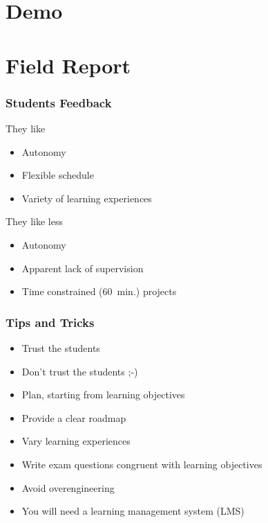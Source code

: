 \section{Demo}

\section{Field Report}

\begin{frame}
  \frametitle{Students Feedback}

  \begin{minipage}{0.48\textwidth}
    They like
    \begin{itemize}
    \item Autonomy
    \item Flexible schedule
    \item Variety of learning experiences
    \end{itemize}
  \end{minipage}
  \hfill
  \begin{minipage}{0.48\textwidth}
    They like less
    \begin{itemize}
    \item Autonomy
    \item Apparent lack of supervision
    \item Time constrained (60~min.) projects
    \end{itemize}
  \end{minipage}
\end{frame}

\begin{frame}
  \frametitle{Tips and Tricks}

  \begin{itemize}[<+->]
  \item Trust the students
  \item Don't trust the students ;-)
  \end{itemize}

  \begin{itemize}[<3->]
  \item Plan, starting from learning objectives
  \item Provide a clear roadmap
  \item Vary learning experiences
  \item Write exam questions congruent with learning objectives
  \item Avoid overengineering
  \end{itemize}

  \begin{itemize}[<4->]
  \item You will need a learning management system (LMS)
  \end{itemize}
\end{frame}


